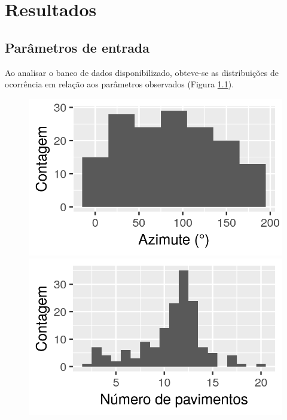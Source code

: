 \documentclass[brazil,hardcopy,openany,a4paper]{ufscthesis}
\begin{document}
	
	\frontmatter
	\folhaderosto[]%
	
	\mainmatter

	\chapter{Resultados}
	\label{chapter:Resultados}
	
	\section{Parâmetros de entrada}
	Ao analisar o banco de dados disponibilizado, obteve-se as distribuições de ocorrência em relação aos parâmetros observados (Figura \ref{fig:db_hist}).
		
	\begin{figure}[h]
		\label{fig:db_hist}
		\centering
		\begin{minipage}{.5\textwidth}
			\centering
			\includegraphics[width=\linewidth]{img/hist_azimute.png}
		\end{minipage}%
		\begin{minipage}{.5\textwidth}
			\centering
			\includegraphics[width=\linewidth]{img/hist_numero_pavimentos.png}

\end{minipage}
\end{figure}
\end{document}
